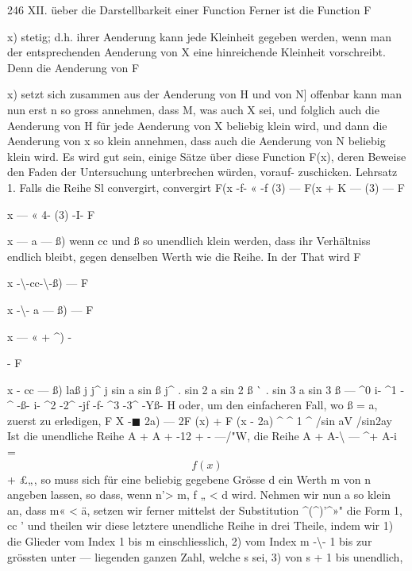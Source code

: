 \documentclass[11pt,a4paper]{article}
\begin{document}
{{{{{{{%
246  XII.   üeber  die  Darstellbarkeit  einer  Function
Ferner  ist  die  Function  F{x)  stetig;  d.h.  ihrer  Aenderung  kann  jede
Kleinheit  gegeben  werden,  wenn  man  der  entsprechenden  Aenderung
von  X  eine  hinreichende  Kleinheit  vorschreibt.  Denn  die  Aenderung
von  F{x)  setzt  sich  zusammen  aus  der  Aenderung  von  H  und  von  N]
offenbar  kann  man  nun  erst  n  so  gross  annehmen,  dass  M,  was  auch
X  sei,  und  folglich  auch  die  Aenderung  von  H  für  jede  Aenderung
von  X  beliebig  klein  wird,  und  dann  die  Aenderung  von  x  so  klein
annehmen,  dass  auch  die  Aenderung  von  N  beliebig  klein  wird.
Es  wird  gut  sein,  einige  Sätze  über  diese  Function  F(x),  deren
Beweise  den  Faden  der  Untersuchung  unterbrechen  würden,  vorauf-
zuschicken.
Lehrsatz  1.     Falls  die  Reihe  Sl  convergirt,  convergirt
F(x  -f-  «  -f  (3)  ---  F(x  +  K  ---  (3)  ---  F{x  ---  «  4-  (3)  -I-  F{x  ---  a  ---  ß)
wenn  cc  und  ß  so  unendlich  klein  werden,  dass  ihr  Verhältniss  endlich
bleibt,  gegen  denselben  Werth  wie  die  Reihe.
In  der  That  wird
F{x  -\textbackslash{}-cc-\textbackslash{}-ß)  ---  F{x  -\textbackslash{}-  a  ---  ß)  ---  F{x  ---  «  +  ^)  -{-  F {x  -  cc  ---  ß)
laß
j     j^    j    sin  a  sin  ß  j^     .    sin  2  a  sin  2  ß  ^^     .    sin  3  a  sin  3  ß
---  ^0  i-  ^1  -^  -ß-  i-  ^2  -2^  -jf  -f-  ^3  -3^  -Yß-  H
oder,  um  den  einfacheren  Fall,  wo  ß  =  a,  zuerst  zu  erledigen,
F  {X  -}$\blacksquare$  2a)  ---  2F  (x)  +  F  (x  -  2a)  ^  ^      1    ^    /sin  aV  /sin2ay
Ist  die  unendliche  Reihe
A  +  A  +  -12  +  -  ---/"W,
die  Reihe
A  +  A-\textbackslash{} --- ^+  A-i  =  $$f(x)$$  +  \pounds„,
so  muss  sich  für  eine  beliebig  gegebene  Grösse  d  ein  Werth  m  von  n
angeben  lassen,  so  dass,  wenn  n'>  m,  f „  <  d  wird.  Nehmen  wir  nun
a  so  klein  an,  dass  m«  <  ä,  setzen  wir  ferner  mittelst  der  Substitution
^(^)'^»"  die  Form
1,  cc  '
und  theilen  wir  diese  letztere  unendliche  Reihe  in  drei  Theile,  indem  wir
1)  die  Glieder  vom  Index  1  bis  m  einschliesslich,
2)  vom  Index  m  -\textbackslash{}-  1   bis  zur  grössten  unter  ---  liegenden  ganzen
Zahl,  welche  s  sei,
3)  von  s  +  1  bis  unendlich,
\newpage

}}}}}}}}}}}}}}}}
\end{document}
